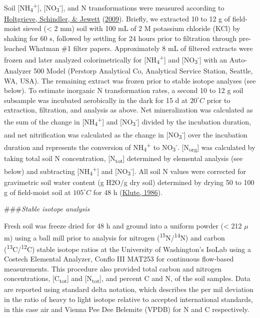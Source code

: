 \documentclass [11pt, proquest] {uwthesis}[2015/03/03]
\begin{document}
Soil {[}NH\textsubscript{4}\textsuperscript{+}{]}, {[}NO\textsubscript{3}\textsuperscript{-}{]}, and N transformations were measured according to \protect\hyperlink{ref-Holtgrieve2009}{Holtgrieve, Schindler, \& Jewett} (\protect\hyperlink{ref-Holtgrieve2009}{2009}). Briefly, we extracted 10 to 12 g of field-moist sieved (\textless{} 2 mm) soil with 100 mL of 2 M potassium chloride (KCl) by shaking for 60 s, followed by settling for 24 hours prior to filtration through pre-leached Whatman \#1 filter papers. Approximately 8 mL of filtered extracts were frozen and later analyzed colorimetrically for {[}NH\textsubscript{4}\textsuperscript{+}{]} and {[}NO\textsubscript{3}\textsuperscript{-}{]} with an Auto-Analyzer 500 Model (Perstorp Analytical Co, Analytical Service Station, Seattle, WA, USA). The remaining extract was frozen prior to stable isotope analyses (see below). To estimate inorganic N transformation rates, a second 10 to 12 g soil subsample was incubated aerobically in the dark for 15 d at \(20^{\circ}C\) prior to extraction, filtration, and analysis as above. Net mineralization was calculated as the sum of the change in {[}NH\textsubscript{4}\textsuperscript{+}{]} and {[}NO\textsubscript{3}\textsuperscript{-}{]} divided by the incubation duration, and net nitrification was calculated as the change in {[}NO\textsubscript{3}\textsuperscript{-}{]} over the incubation duration and represents the conversion of NH\textsubscript{4}\textsuperscript{+} to NO\textsubscript{3}\textsuperscript{-}. {[}N\textsubscript{org}{]} was calculated by taking total soil N concentration, {[}N\textsubscript{tot}{]} determined by elemental analysis (see below) and subtracting {[}NH\textsubscript{4}\textsuperscript{+}{]} and {[}NO\textsubscript{3}\textsuperscript{-}{]}. All soil N values were corrected for gravimetric soil water content (g H2O/g dry soil) determined by drying 50 to 100 g of field-moist soil at \(105^{\circ}C\) for 48 h (\protect\hyperlink{ref-Klute1986}{Klute, 1986}).

\#\#\#\emph{Stable isotope analysis}

Fresh soil was freeze dried for 48 h and ground into a uniform powder (\textless{} 212 \(\mu\)m) using a ball mill prior to analysis for nitrogen (\textsuperscript{15}N/\textsuperscript{14}N) and carbon (\textsuperscript{13}C/\textsuperscript{12}C) stable isotope ratios at the University of Washington's IsoLab using a Costech Elemental Analyzer, Conflo III MAT253 for continuous flow-based measurements. This procedure also provided total carbon and nitrogen concentrations, {[}C\textsubscript{tot}{]} and {[}N\textsubscript{tot}{]}, and percent C and N, of the soil samples. Data are reported using standard delta notation, which describes the per mil deviation in the ratio of heavy to light isotope relative to accepted international standards, in this case air and Vienna Pee Dee Belemite (VPDB) for N and C respectively.
\end{document}
